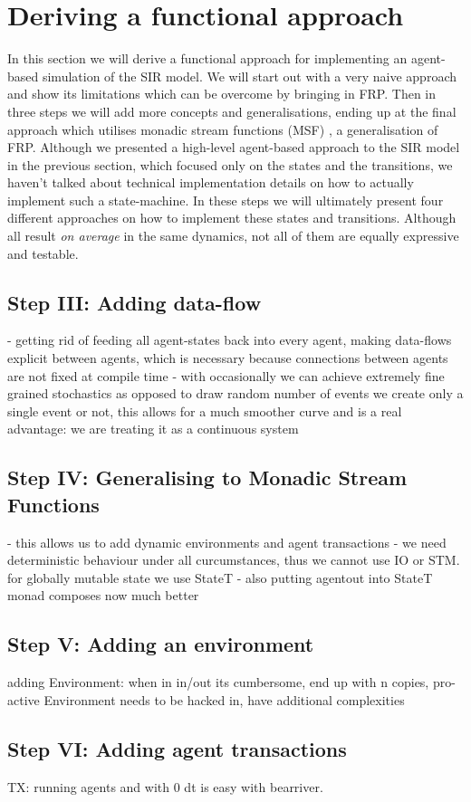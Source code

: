 \section{Deriving a functional approach}

In this section we will derive a functional approach for implementing an agent-based simulation of the SIR model. We will start out with a very naive approach and show its limitations which can be overcome by bringing in FRP. Then in three steps we will add more concepts and generalisations, ending up at the final approach which utilises monadic stream functions (MSF) \cite{perez_functional_2016}, a generalisation of FRP.
Although we presented a high-level agent-based approach to the SIR model in the previous section, which focused only on the states and the transitions, we haven't talked about technical implementation details on how to actually implement such a state-machine. In these steps we will ultimately present four different approaches on how to implement these states and transitions. Although all result \textit{on average} in the same dynamics, not all of them are equally expressive and testable.





\subsection{Step III: Adding data-flow}
- getting rid of feeding all agent-states back into every agent, making data-flows explicit between agents, which is necessary because connections between agents are not fixed at compile time
- with occasionally we can achieve extremely fine grained stochastics as opposed to draw random number of events we create only a single event or not, this allows for a much smoother curve and is a real advantage: we are treating it as a continuous system

\subsection{Step IV: Generalising to Monadic Stream Functions}
- this allows us to add dynamic environments and agent transactions
- we need deterministic behaviour under all curcumstances, thus we cannot use IO or STM. for globally mutable state we use StateT
- also putting agentout into StateT monad composes now much better

\subsection{Step V: Adding an environment}
adding Environment: when in in/out its cumbersome, end up with n copies, pro-active Environment needs to be hacked in, have additional complexities
 
\subsection{Step VI: Adding agent transactions}
TX: running agents and with 0 dt is easy with bearriver.